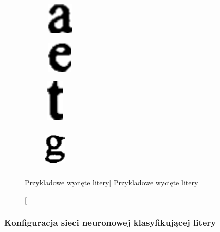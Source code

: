 \documentclass[a4paper,12pt]{article}
\begin{document}
            \begin{figure}[h!]
                \centering
                \begin{subfigure}[b]{2cm}
                    \includegraphics[width=1.5cm, height=1.5cm, frame]{image//exampleImage//letter_01.png}
                    \caption{}
                \end{subfigure}
                \begin{subfigure}[b]{2cm}
                    \includegraphics[width=1.5cm, height=1.5cm, frame]{image//exampleImage//letter_02.png}
                \caption{}
                \end{subfigure}
                \newline
                \begin{subfigure}[b]{2cm}
                    \includegraphics[width=1cm, height=2cm, frame]{image//exampleImage//letter_03.png}
                    \caption{}
                \end{subfigure}
                \begin{subfigure}[b]{2cm}
                    \includegraphics[width=1cm, height=2cm, frame]{image//exampleImage//letter_04.png}
                    \caption{}
                \end{subfigure}
                \caption
                [Przykladowe wycięte litery]
                {Przykladowe wycięte litery}
            \end{figure}

        \subsubsection{Konfiguracja sieci neuronowej klasyfikującej litery}
\end{document}
